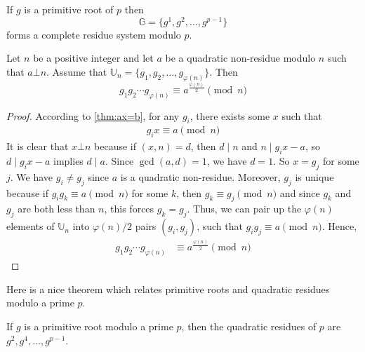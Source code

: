 \begin{corollary}\label{cor:prres}
	If $g$ is a primitive root of $p$ then
	\[\mathbb G=\{g^1,g^2,\ldots,g^{p-1}\}\]
	forms a complete residue system modulo $p$.
\end{corollary}

\begin{theorem}\label{prd}
	Let $n$ be a positive integer and let $a$ be a quadratic non-residue modulo $n$ such that $a\bot n$. Assume that $\mathbb U_n = \{g_1, g_2, \ldots, g_{\varphi(n)}\}$. Then
	\[g_1g_2\cdots g_{\varphi(n)}\equiv a^{\frac{\varphi(n)}{2}}\pmod n\]
\end{theorem}

\begin{proof}
	According to \autoref{thm:ax=b}, for any $g_i$, there exists some $x$ such that
		\begin{align}
			g_i x\equiv a\pmod n
		\end{align}
	It is clear that $x \bot n$ because if $(x,n)=d$, then $d\mid n$ and $n\mid g_{i}x-a$, so $d\mid g_ix-a$ implies $d\mid a$. Since $\gcd(a,d)=1$, we have $d=1$. So $x=g_j$ for some $j$. We have $g_i \neq g_j$ since $a$ is a quadratic non-residue. Moreover, $g_j$ is unique because if $g_ig_k \equiv a \pmod n$ for some $k$, then $g_k \equiv g_j \pmod n$ and since $g_k$ and $g_j$ are both less than $n$, this forces $g_k=g_j$. Thus, we can pair up the $\varphi(n)$ elements of $\mathbb{U}_n$ into $\varphi(n)/2$ pairs $(g_i, g_j)$, such that $g_ig_j \equiv a \pmod n$. Hence,
		\begin{align*}
			g_1g_2\cdots g_{\varphi(n)}
				& \equiv a^{\frac{\varphi(n)}{2}}\pmod n
		\end{align*}
\end{proof}
Here is a nice theorem which relates primitive roots and quadratic residues modulo a prime $p$.
\begin{theorem}\label{thm:pr+qr}
	If $g$ is a primitive root modulo a prime $p$, then the quadratic residues of $p$ are $g^2,g^4,\ldots,g^{p-1}$.
\end{theorem}

